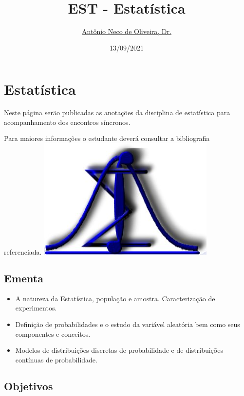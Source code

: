\documentclass[
]{book}
\title{EST - Estatística}
\author{\href{}{Antônio Neco de Oliveira, Dr.}}
\date{13/09/2021}
\begin{document}
\maketitle

{
\setcounter{tocdepth}{1}
\tableofcontents
}
\hypertarget{estatuxedstica}{%
\chapter*{Estatística}\label{estatuxedstica}}

Neste página serão publicadas as anotações da disciplina de estatística para acompanhamento dos encontros síncronos.

Para maiores informações o estudante deverá consultar a bibliografia referenciada.
\includegraphics{./img/simbolo.jpg}

\hypertarget{ementa}{%
\section*{Ementa}\label{ementa}}

\begin{itemize}
\item
  A natureza da Estatística, população e amostra. Caracterização de experimentos.
\item
  Definição de probabilidades e o estudo da variável aleatória bem como seus componentes e conceitos.
\item
  Modelos de distribuições discretas de probabilidade e de distribuições contínuas de probabilidade.
\end{itemize}

\hypertarget{objetivos}{%
\section*{Objetivos}\label{objetivos}}
\end{document}
